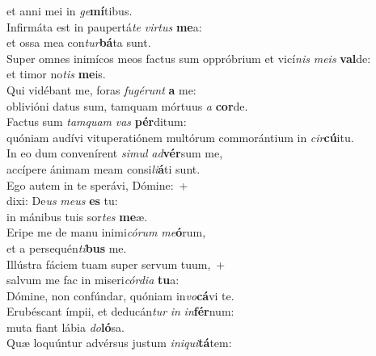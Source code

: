 \evenverse et anni mei in \textit{ge}\textbf{mí}tibus.\\
\oddverse Infirmáta est in paupertá\textit{te} \textit{vir}\textit{tus} \textbf{me}a:~\*\\
\oddverse et ossa mea con\textit{tur}\textbf{bá}ta sunt.\\
\evenverse Super omnes inimícos meos factus sum oppróbrium et vicí\textit{nis} \textit{me}\textit{is} \textbf{val}de:~\*\\
\evenverse et timor no\textit{tis} \textbf{me}is.\\
\oddverse Qui vidébant me, foras \textit{fu}\textit{gé}\textit{runt} \textbf{a} me:~\*\\
\oddverse oblivióni datus sum, tamquam mórtuus \textit{a} \textbf{cor}de.\\
\evenverse Factus sum \textit{tam}\textit{quam} \textit{vas} \textbf{pér}ditum:~\*\\
\evenverse quóniam audívi vituperatiónem multórum commorántium in \textit{cir}\textbf{cú}itu.\\
\oddverse In eo dum convenírent \textit{si}\textit{mul} \textit{ad}\textbf{vér}sum me,~\*\\
\oddverse accípere ánimam meam consi\textit{li}\textbf{á}ti sunt.\\
\evenverse Ego autem in te sperávi, Dómine:~+\\
\evenverse  dixi: De\textit{us} \textit{me}\textit{us} \textbf{es} tu:~\*\\
\evenverse in mánibus tuis sor\textit{tes} \textbf{me}æ.\\
\oddverse Eripe me de manu inimi\textit{có}\textit{rum} \textit{me}\textbf{ó}rum,~\*\\
\oddverse et a persequén\textit{ti}\textbf{bus} me.\\
\evenverse Illústra fáciem tuam super servum tuum,~+\\
\evenverse  salvum me fac in miseri\textit{cór}\textit{di}\textit{a} \textbf{tu}a:~\*\\
\evenverse Dómine, non confúndar, quóniam in\textit{vo}\textbf{cá}vi te.\\
\oddverse Erubéscant ímpii, et deducán\textit{tur} \textit{in} \textit{in}\textbf{fér}num:~\*\\
\oddverse muta fiant lábia \textit{do}\textbf{ló}sa.\\
\evenverse Quæ loquúntur advérsus justum \textit{i}\textit{ni}\textit{qui}\textbf{tá}tem:~\*\\
